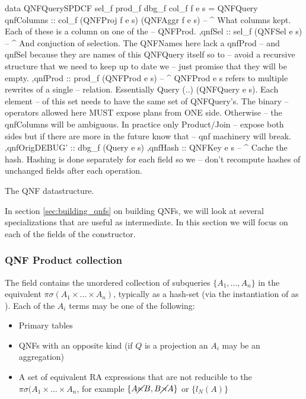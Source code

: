 \begin{code}
  \begin{haskellcode}
    data QNFQuerySPDCF sel_f prod_f dbg_f col_f f e s =
      QNFQuery
      { qnfColumns :: col_f (QNFProj f e s) (QNFAggr f e s)
        -- ^ What columns kept. Each of these is a column on one of the
        -- QNFProd.
        ,qnfSel :: sel_f (QNFSel e s)
        -- ^ And conjuction of selection. The QNFNames here lack a qnfProd
        -- and qnfSel because they are names of this QNFQuery itself so to
        -- avoid a recursive structure that we need to keep up to date we
        -- just promise that they will be empty.
        ,qnfProd :: prod_f (QNFProd e s)
        -- ^ QNFProd e s refers to multiple rewrites of a single
        -- relation. Essentially {Query (..) (QNFQuery e s)}. Each element
        -- of this set needs to have the same set of QNFQuery's. The binary
        -- operators allowed here MUST expose plans from ONE side. Otherwise
        -- the qnfColumns will be ambiguous. In practice only Product/Join
        -- expose both sides but if there are more in the future know that
        -- qnf machinery will break.
        ,qnfOrigDEBUG' :: dbg_f (Query e s)
        ,qnfHash :: QNFKey e s
        -- ^ Cache the hash. Hashing is done separately for each field so we
        -- don't recompute hashes of unchanged fields after each operation.
      }
  \end{haskellcode}
  \label{lst:qnf_struct}
  \caption{The QNF datastructure.}
\end{code}

In section \ref{sec:building_qnfs} on building QNFs,
we will look at several specializations that are useful as intermediate. In this
section we will focus on each of the fields of the 
constructor.

\subsubsection{QNF Product collection}

The  field contains the
unordered collection of subqueries \(\{A_1,... , A_n\}\) in the
equivalent \(\pi \sigma (A_1 \times ... \times A_n)\), typically as a
hash-set (via the instantiation of  as
). Each of the \(A_i\) terms may be one of the following:

\begin{itemize}
\item Primary tables
\item QNFs with an opposite kind  (if \(Q\) is a projection an
  \(A_i\) may be an aggregation)
\item A set of equivalent RA expressions that are not reducible to the
  \(\pi \sigma(A_1 \times ... \times A_n\), for example \(\{A \cancel\ltimes B,B \cancel\rtimes A\}\)
  or \(\{l_N(A)\}\)
\end{itemize}

